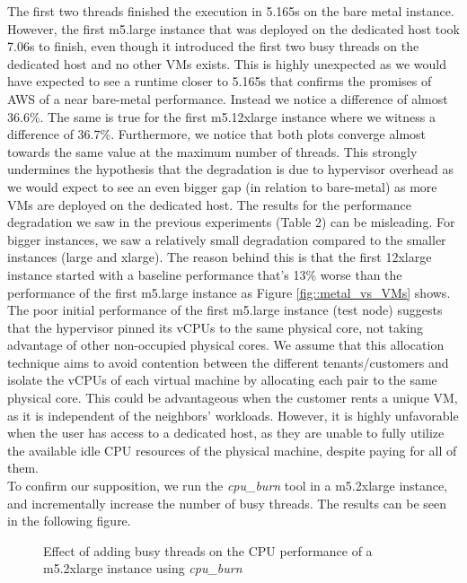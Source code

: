 \noindent
The first two threads finished the execution in 5.165s on the bare metal instance. However, the 
first m5.large instance that  was deployed on the dedicated host took 7.06s to 
finish, even though it introduced the first two busy threads on the dedicated host and no other VMs exists.
This is highly unexpected as we would have expected to see a runtime closer to 5.165s that confirms 
the promises of AWS of a near bare-metal performance. Instead we notice a difference of almost 36.6\%. 
The same is true for the first m5.12xlarge instance where we witness a difference of 36.7\%. Furthermore, we notice that both plots converge almost towards the same value at 
the maximum number of threads. This strongly undermines the hypothesis that the degradation is due to 
hypervisor overhead as we would expect to see an even bigger gap (in relation to bare-metal) as 
more VMs are deployed on the dedicated host. The results for the performance degradation we saw in 
the previous experiments (Table 2) can be misleading. For bigger instances, we saw a relatively small 
degradation compared to the smaller instances (large and xlarge). The reason behind this is that the 
first 12xlarge instance started with a baseline performance that's 13\% worse than the performance 
of the first m5.large instance as Figure \ref{fig::metal_vs_VMs} shows. \\
The poor initial performance of the first m5.large instance (test node) suggests that the hypervisor 
pinned its vCPUs to the same physical core, not taking advantage of other non-occupied physical cores. 
We assume that this allocation technique aims to avoid contention between the different tenants/customers 
and isolate the vCPUs of each virtual machine by allocating each pair to the same physical core. 
This could be advantageous when the customer rents a unique VM, as it is independent of the neighbors’ 
workloads. However, it is highly unfavorable when the user has access to a dedicated host, as they 
are unable to fully utilize the available idle CPU resources of the physical machine, despite paying 
for all of them. \\
To confirm our supposition, we run the \textit{cpu\_burn} tool in a m5.2xlarge instance, and incrementally 
increase the number of busy threads. The results can be seen in the following figure. 
\begin{figure}[H]
\centering
{}
\caption{Effect of adding busy threads on the CPU performance of a m5.2xlarge instance using \textit{cpu\_burn}} 
\label{fig::m5_inter}
\end{figure}
